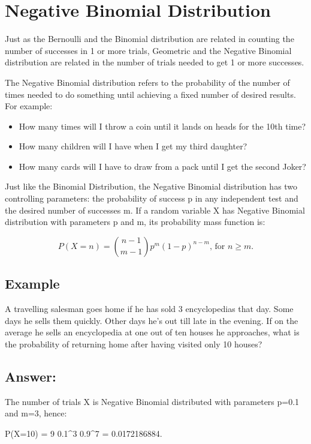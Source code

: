 \section{Negative Binomial Distribution}
Just as the Bernoulli and the Binomial distribution are related in counting the number of successes in 1 or more trials, 
Geometric and the Negative Binomial distribution are related in the number of trials needed to get 1 or more successes.

The Negative Binomial distribution refers to the probability of the number of times needed to do something until achieving a fixed number of desired results. For example:

\begin{itemize}
\item How many times will I throw a coin until it lands on heads for the 10th time?
\item How many children will I have when I get my third daughter?
\item How many cards will I have to draw from a pack until I get the second Joker?
\end{itemize}

Just like the Binomial Distribution, the Negative Binomial distribution has two controlling parameters: the probability of success p in any independent test and the desired number of successes m. If a random variable X has Negative Binomial distribution with parameters p and m, its probability mass function is:

\[P(X=n) = {n-1 \choose m-1} p^m (1-p)^{n-m} \mbox{, for } n \ge m.\]
\subsection{Example}
A travelling salesman goes home if he has sold 3 encyclopedias that day. Some days he sells them quickly. Other days he's out till late in the evening. If on the average he sells an encyclopedia at one out of ten houses he approaches, what is the probability of returning home after having visited only 10 houses?

\subsection{Answer:}

The number of trials X is Negative Binomial distributed with parameters p=0.1 and m=3, hence:

P(X=10) = {9 } 0.1^3 0.9^7 = 0.0172186884.

